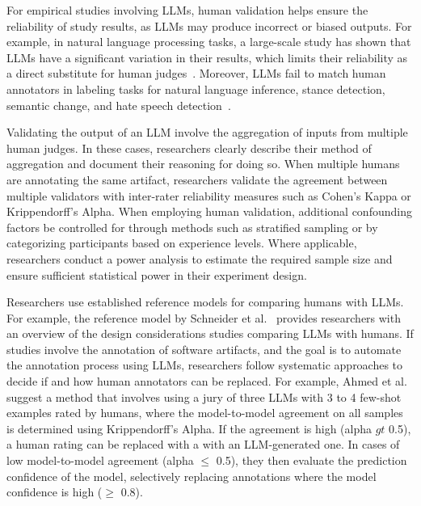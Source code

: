 For empirical studies involving LLMs, human validation helps ensure the reliability of study results, as LLMs may produce incorrect or biased outputs.
For example, in natural language processing tasks, a large-scale study has shown that LLMs have a significant variation in their results, which limits their reliability as a direct substitute for human judges~\cite{DBLP:journals/corr/abs-2406-18403}. 
Moreover, LLMs fail to match human annotators in labeling tasks for natural language inference, stance detection, semantic change, and hate speech detection~\cite{DBLP:conf/chi/Wang0RMM24}.

Validating the output of an LLM \may involve the aggregation of inputs from multiple human judges.
In these cases, researchers \should clearly describe their method of aggregation and document their reasoning for doing so.
When multiple humans are annotating the same artifact, researchers \should validate the agreement between multiple validators with inter-rater reliability measures such as Cohen's Kappa or Krippendorff's Alpha.
When employing human validation, additional confounding factors \should be controlled for through methods such as stratified sampling or by categorizing participants based on experience levels.
Where applicable, researchers \should conduct a power analysis to estimate the required sample size and ensure sufficient statistical power in their experiment design.

Researchers \should use established reference models for comparing humans with LLMs.
For example, the reference model by Schneider et al.~\cite{Schneider2025ReferenceModel} provides researchers with an overview of the design considerations studies comparing LLMs with humans.
If studies involve the annotation of software artifacts, and the goal is to automate the annotation process using LLMs, researchers \should follow systematic approaches to decide if and how human annotators can be replaced.
For example, Ahmed et al.~\cite{DBLP:journals/corr/abs-2408-05534} suggest a method that involves using a jury of three LLMs with 3 to 4 few-shot examples rated by humans, where the model-to-model agreement on all samples is determined using Krippendorff's Alpha.
If the agreement is high (alpha $gt$ 0.5), a human rating can be replaced with a with an LLM-generated one.
In cases of low model-to-model agreement (alpha $\le$ 0.5), they then evaluate the prediction confidence of the model, selectively replacing annotations where the model confidence is high ($\ge$ 0.8).


